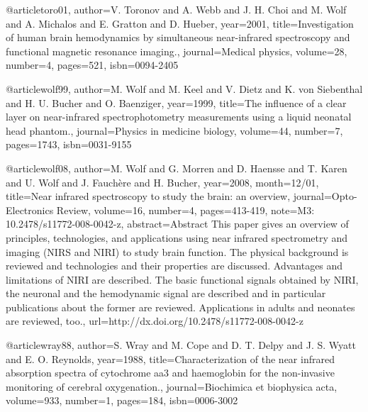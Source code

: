 @article{toro01,
	author={V. Toronov and A. Webb and J. H. Choi and M. Wolf and A. Michalos and E. Gratton and D. Hueber},
	year={2001},
	title={Investigation of human brain hemodynamics by simultaneous near-infrared spectroscopy and functional magnetic resonance imaging.},
	journal={Medical physics},
	volume={28},
	number={4},
	pages={521},
	isbn={0094-2405}
}

@article{wolf99,
	author={M. Wolf and M. Keel and V. Dietz and K. von Siebenthal and H. U. Bucher and O. Baenziger},
	year={1999},
	title={The influence of a clear layer on near-infrared spectrophotometry measurements using a liquid neonatal head phantom.},
	journal={Physics in medicine biology},
	volume={44},
	number={7},
	pages={1743},
	isbn={0031-9155}
}

@article{wolf08,
	author={M. Wolf and G. Morren and D. Haensse and T. Karen and U. Wolf and J. Fauchère and H. Bucher},
	year={2008},
	month={12/01},
	title={Near infrared spectroscopy to study the brain: an overview},
	journal={Opto-Electronics Review},
	volume={16},
	number={4},
	pages={413-419},
	note={M3: 10.2478/s11772-008-0042-z},
	abstract={Abstract This paper gives an overview of principles, technologies, and applications using near infrared spectrometry and imaging (NIRS and NIRI) to study brain function. The physical background is reviewed and technologies and their properties are discussed. Advantages and limitations of NIRI are described. The basic functional signals obtained by NIRI, the neuronal and the hemodynamic signal are described and in particular publications about the former are reviewed. Applications in adults and neonates are reviewed, too.},
	url={http://dx.doi.org/10.2478/s11772-008-0042-z}
}

@article{wray88,
	author={S. Wray and M. Cope and D. T. Delpy and J. S. Wyatt and E. O. Reynolds},
	year={1988},
	title={Characterization of the near infrared absorption spectra of cytochrome aa3 and haemoglobin for the non-invasive monitoring of cerebral oxygenation.},
	journal={Biochimica et biophysica acta},
	volume={933},
	number={1},
	pages={184},
	isbn={0006-3002}
}

